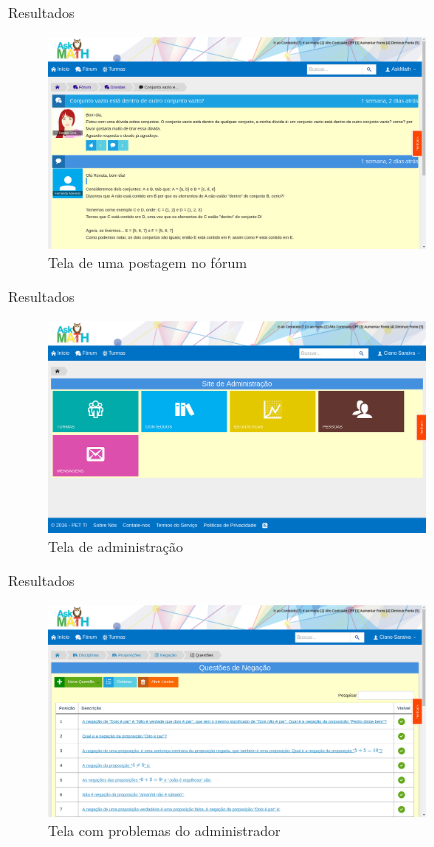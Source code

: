 \documentclass[aspectratio=169]{beamer}
\begin{document}
\begin{frame}{Resultados}
	\begin{figure}[H]
	\centering
	\caption{Tela de uma postagem no fórum}
	\includegraphics[width=10cm]{figuras/askmath/5.png}
	\end{figure}
\end{frame}

\begin{frame}{Resultados}
	\begin{figure}[H]
	\centering
	\caption{Tela de administração}
	\includegraphics[width=10cm]{figuras/askmath/3.png}
	\end{figure}
\end{frame}

\begin{frame}{Resultados}
	\begin{figure}[H]
	\centering
	\caption{Tela com problemas do administrador}
	\includegraphics[width=10cm]{figuras/askmath/6.png}
	\end{figure}
\end{frame}
\end{document}
